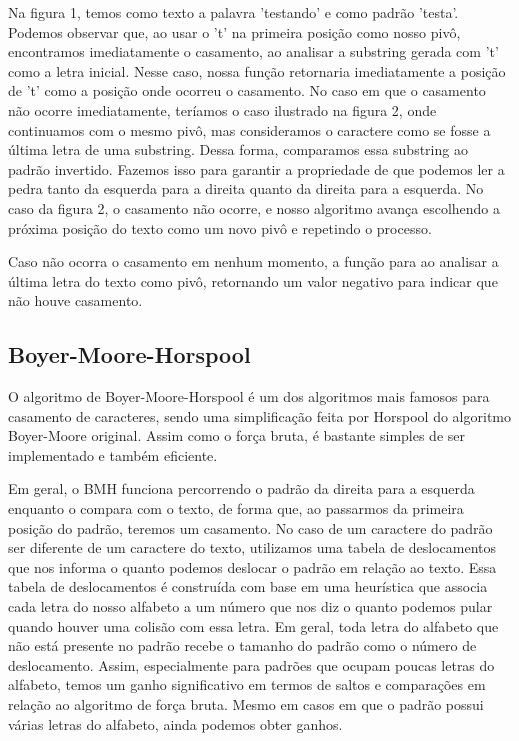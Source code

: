 \documentclass[12pt]{article}
\begin{document}
            Na figura 1, temos como texto a palavra 'testando' e como padrão 'testa'. Podemos observar que, ao usar 
            o 't' na primeira posição como nosso pivô, encontramos imediatamente o casamento, ao analisar a substring 
            gerada com 't' como a letra inicial. Nesse caso, nossa função retornaria imediatamente a posição de 't' 
            como a posição onde ocorreu o casamento. No caso em que o casamento não ocorre imediatamente, teríamos o 
            caso ilustrado na figura 2, onde continuamos com o mesmo pivô, mas consideramos o caractere como se fosse 
            a última letra de uma substring. Dessa forma, comparamos essa substring ao padrão invertido. Fazemos isso 
            para garantir a propriedade de que podemos ler a pedra tanto da esquerda para a direita quanto da direita 
            para a esquerda. No caso da figura 2, o casamento não ocorre, e nosso algoritmo avança escolhendo a 
            próxima posição do texto como um novo pivô e repetindo o processo.

            Caso não ocorra o casamento em nenhum momento, a função para ao analisar a última letra do texto como pivô, 
            retornando um valor negativo para indicar que não houve casamento.
            
        \subsection{Boyer-Moore-Horspool}
            O algoritmo de Boyer-Moore-Horspool é um dos algoritmos mais famosos para casamento de caracteres, sendo 
            uma simplificação feita por Horspool do algoritmo Boyer-Moore original. Assim como o força bruta, é bastante 
            simples de ser implementado e também eficiente.

            Em geral, o BMH funciona percorrendo o padrão da direita para a esquerda enquanto o compara com o texto, 
            de forma que, ao passarmos da primeira posição do padrão, teremos um casamento. No caso de um caractere do 
            padrão ser diferente de um caractere do texto, utilizamos uma tabela de deslocamentos que nos informa o 
            quanto podemos deslocar o padrão em relação ao texto. Essa tabela de deslocamentos é construída com base em 
            uma heurística que associa cada letra do nosso alfabeto a um número que nos diz o quanto podemos pular quando 
            houver uma colisão com essa letra. Em geral, toda letra do alfabeto que não está presente no padrão recebe 
            o tamanho do padrão como o número de deslocamento. Assim, especialmente para padrões que ocupam poucas letras 
            do alfabeto, temos um ganho significativo em termos de saltos e comparações em relação ao algoritmo de 
            força bruta. Mesmo em casos em que o padrão possui várias letras do alfabeto, ainda podemos obter ganhos.
            
\end{document}
